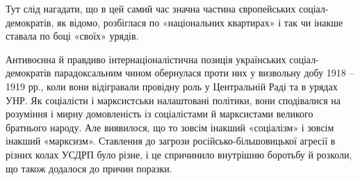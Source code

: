 \documentclass{kapital}
\begin{document}
Тут слід нагадати, що в цей самий час значна частина  європейських соціал-демократів, як відомо, розбіглася по «національних квартирах» і так чи інакше ставала по боці «своїх» урядів. 
 
	Антивоєнна й правдиво інтернаціоналістична позиція українських соціал-демократів парадоксальним чином обернулася проти них у визвольну добу 1918 – 1919 рр., коли вони відігравали провідну роль у Центральній Раді та в урядах УНР. Як соціалісти і марксистськи налаштовані політики, вони сподівалися на розуміння і мирну домовленість із  соціалістами й марксистами великого братнього народу. Але виявилося, що то зовсім інакший «соціалізм» і зовсім інакший «марксизм». Ставлення до загрози російсько-більшовицької агресії в різних колах УСДРП  було  різне, і це спричинило внутрішню боротьбу й  розколи, що також додалося до причин поразки.   
 
\end{document}
